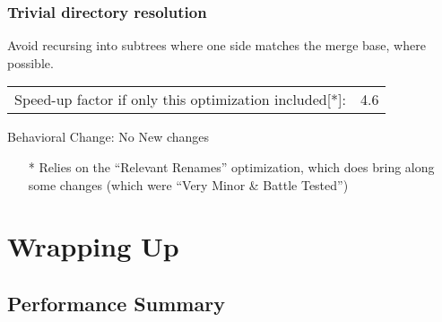 \documentclass[compress,t]{beamer}
\begin{document}
\begin{frame}
  \frametitle{Trivial directory resolution}

  Avoid recursing into subtrees where one side matches the merge base,
  where possible.

  \pause
  \vspace*{\baselineskip}
  \begin{tabular}{lr}
    Speed-up factor if only this optimization included[*]:  & 4.6 \\
  \end{tabular}

  \vspace*{2\baselineskip}
  {\scriptsize
  \pause
  Behavioral Change: No New changes
  \begin{itemize}
    \item [*] Relies on the ``Relevant Renames'' optimization, which does bring
          along some changes (which were ``Very Minor \& Battle Tested'')
  \end{itemize}
  }

\end{frame}

\section{Wrapping Up}
\subsection{Performance Summary}
\end{document}
